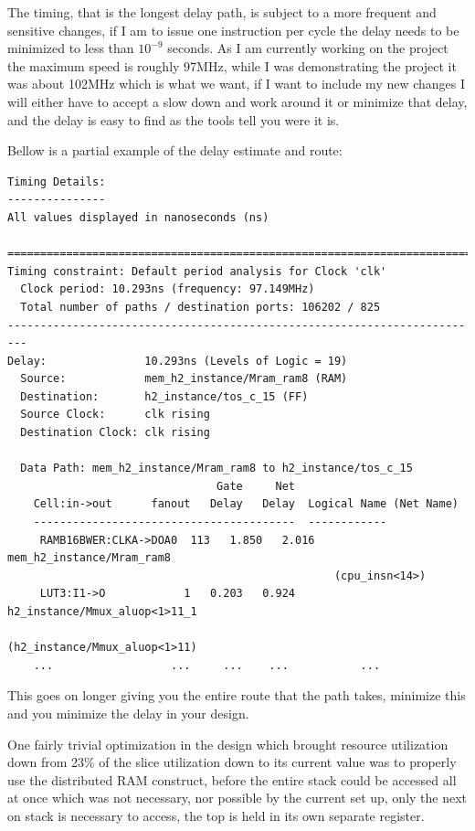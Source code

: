 \documentclass	[a4paper, 10pt]	{article}
\begin{document}
  The timing, that is the longest delay path, is subject to a more frequent and sensitive
  changes, if I am to issue one instruction per cycle the delay needs to be minimized to
  less than $10^{-9}$ seconds. As I am currently working on the project the maximum speed
  is roughly 97MHz, while I was demonstrating the project it was about 102MHz which is what
  we want, if I want to include my new changes I will either have to accept a slow down and
  work around it or minimize that delay, and the delay is easy to find as the tools tell you
  were it is.

  Bellow is a partial example of the delay estimate and route:

\begin{verbatim}
Timing Details:
---------------
All values displayed in nanoseconds (ns)

=========================================================================
Timing constraint: Default period analysis for Clock 'clk'
  Clock period: 10.293ns (frequency: 97.149MHz)
  Total number of paths / destination ports: 106202 / 825
-------------------------------------------------------------------------
Delay:               10.293ns (Levels of Logic = 19)
  Source:            mem_h2_instance/Mram_ram8 (RAM)
  Destination:       h2_instance/tos_c_15 (FF)
  Source Clock:      clk rising
  Destination Clock: clk rising

  Data Path: mem_h2_instance/Mram_ram8 to h2_instance/tos_c_15
                                Gate     Net
    Cell:in->out      fanout   Delay   Delay  Logical Name (Net Name)
    ----------------------------------------  ------------
     RAMB16BWER:CLKA->DOA0  113   1.850   2.016  mem_h2_instance/Mram_ram8 
                                                  (cpu_insn<14>)
     LUT3:I1->O            1   0.203   0.924  h2_instance/Mmux_aluop<1>11_1 
                                              (h2_instance/Mmux_aluop<1>11)
    ...                  ...     ...    ...           ...
\end{verbatim}

  This goes on longer giving you the entire route that the path takes, minimize
  this and you minimize the delay in your design.

  One fairly trivial optimization in the design which brought resource utilization
  down from 23\% of the slice utilization down to its current value was to properly
  use the distributed RAM construct, before the entire stack could be accessed all
  at once which was not necessary, nor possible by the current set up, only the
  next on stack is necessary to access, the top is held in its own separate register.
\end{document}

